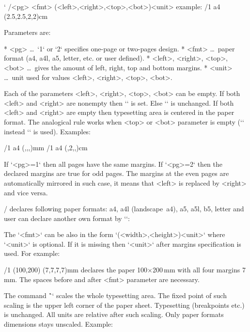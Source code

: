 \begtt \catcode`
\margins/<pg> <fmt> (<left>,<right>,<top>,<bot>)<unit>
  example:
\margins/1 a4 (2.5,2.5,2,2)cm
\endtt

Parameters are:

\begitems
* <pg> \dots\ `1` or `2` specifies one-page or two-pages design.
* <fmt> \dots\ paper format (a4, a4l, a5, letter, etc. or user defined).
* <left>, <right>, <top>, <bot> \dots\ gives the amount of left, right,
      top and bottom margins.
* <unit> \dots\ unit used for values <left>, <right>, <top>, <bot>.
\enditems

Each of the parameters <left>, <right>, <top>, <bot> can be empty.
If both <left> and <right> are nonempty then `\hsize` is set. Else `\hsize`
is unchanged. If both <left> and <right> are empty then typesetting area is
centered in the paper format. The analogical rule works when <top> or <bot>
parameter is empty (`\vsize` instead `\hsize` is used). Examples:

\begtt
\margins/1 a4 (,,,)mm   %
\margins/1 a4 (,2,,)cm  %
\endtt

If `<pg>=1` then all pages have the same margins. If `<pg>=2` then the
declared margins are true for odd pages. The margins at the even pages are
automatically mirrored in such case, it means that <left> is replaced by 
<right> and vice versa.

\OpTeX/ declares following paper formats: a4, a4l (landscape~a4), 
a5, a5l, b5, letter and user can declare another own format by `\sdef`:

\begtt
{} 
\endtt

The `<fmt>` can be also in the form `(<width>,<height>)<unit>` where `<unit>` is
optional. If it is missing then `<unit>` after margins specification is
used. For example:

\begtt
\margins/1 (100,200) (7,7,7,7)mm
\endtt
%
declares the paper 100$\times$200\,mm with all four margins 7\,mm. The spaces
before and after <fmt> parameter are necessary.

The command \^`\magscale[<factor>]` scales the whole typesetting area. 
\new The fixed point of such scaling is the upper left corner of the paper sheet. 
Typesetting (breakpoints etc.) is unchanged. All units are relative after
such scaling. Only paper formats dimensions stays unscaled. Example:

